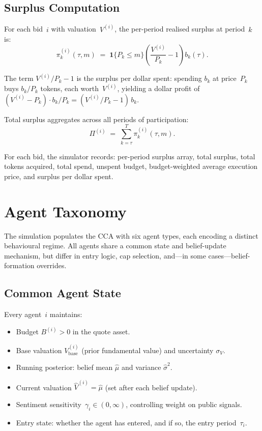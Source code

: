 \documentclass[11pt,a4paper]{article}
\newcommand{\Ind}{\mathbf{1}}
\begin{document}
\subsection{Surplus Computation}
\label{sec:surplus}

For each bid~$i$ with valuation~$V^{(i)}$, the per-period realised surplus at period~$k$ is:
\begin{equation}\label{eq:surplus-period}
  \pi_k^{(i)}(\tau, m) \;=\; \Ind\{P_k \leq m\}\left(\frac{V^{(i)}}{P_k} - 1\right) b_k(\tau).
\end{equation}

The term $V^{(i)}/P_k - 1$ is the surplus per dollar spent: spending $b_k$ at price~$P_k$ buys $b_k / P_k$ tokens, each worth~$V^{(i)}$, yielding a dollar profit of $(V^{(i)} - P_k) \cdot b_k / P_k = (V^{(i)}/P_k - 1)\,b_k$.

Total surplus aggregates across all periods of participation:
\begin{equation}\label{eq:surplus-total}
  \Pi^{(i)} \;=\; \sum_{k=\tau}^{T} \pi_k^{(i)}(\tau, m).
\end{equation}

For each bid, the simulator records: per-period surplus array, total surplus, total tokens acquired, total spend, unspent budget, budget-weighted average execution price, and surplus per dollar spent.


\section{Agent Taxonomy}
\label{sec:agents}

The simulation populates the CCA with six agent types, each encoding a distinct behavioural regime.  All agents share a common state and belief-update mechanism, but differ in entry logic, cap selection, and—in some cases—belief-formation overrides.

\subsection{Common Agent State}
\label{sec:agent-state}

Every agent~$i$ maintains:
\begin{itemize}[nosep]
  \item Budget $B^{(i)} > 0$ in the quote asset.
  \item Base valuation $V^{(i)}_{\text{base}}$ (prior fundamental value) and uncertainty $\sigma_V$.
  \item Running posterior: belief mean $\hat{\mu}$ and variance $\hat{\sigma}^2$.
  \item Current valuation $\hat{V}^{(i)} = \hat{\mu}$ (set after each belief update).
  \item Sentiment sensitivity~$\gamma_i \in (0,\infty)$, controlling weight on public signals.
  \item Entry state: whether the agent has entered, and if so, the entry period~$\tau_i$.
\end{itemize}
\end{document}
